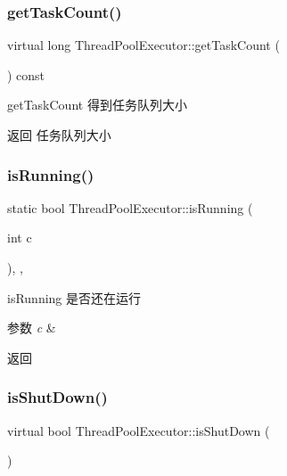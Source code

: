 \subsubsection{\texorpdfstring{get\+Task\+Count()}{getTaskCount()}}
{\footnotesize\ttfamily virtual long Thread\+Pool\+Executor\+::get\+Task\+Count (\begin{DoxyParamCaption}{ }\end{DoxyParamCaption}) const\hspace{0.3cm}{\ttfamily [virtual]}}



get\+Task\+Count 得到任务队列大小 

\begin{DoxyReturn}{返回}
任务队列大小 
\end{DoxyReturn}
\mbox{\label{classThreadPoolExecutor_a6a08024efe3dd52349a4c3cc3e816223}} 
\subsubsection{\texorpdfstring{is\+Running()}{isRunning()}}
{\footnotesize\ttfamily static bool Thread\+Pool\+Executor\+::is\+Running (\begin{DoxyParamCaption}\item[{int}]{c }\end{DoxyParamCaption})\hspace{0.3cm}{\ttfamily [inline]}, {\ttfamily [static]}, {\ttfamily [protected]}}



is\+Running 是否还在运行 


\begin{DoxyParams}{参数}
{\em c} & \\
\hline
\end{DoxyParams}
\begin{DoxyReturn}{返回}

\end{DoxyReturn}
\mbox{\label{classThreadPoolExecutor_a37702302c7a946b998ce92048ce68e2f}} 
\subsubsection{\texorpdfstring{is\+Shut\+Down()}{isShutDown()}}
{\footnotesize\ttfamily virtual bool Thread\+Pool\+Executor\+::is\+Shut\+Down (\begin{DoxyParamCaption}{ }\end{DoxyParamCaption})\hspace{0.3cm}{\ttfamily [virtual]}}



